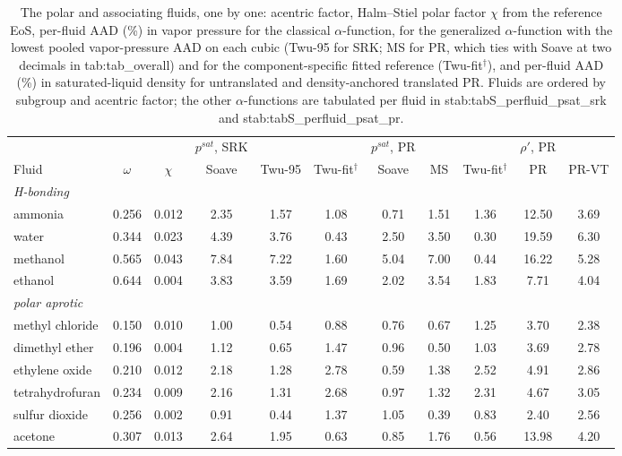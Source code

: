 \begin{table}[H]
\centering
\caption{The polar and associating fluids, one by one: acentric factor, Halm--Stiel polar factor $\chi$ from the reference EoS, per-fluid AAD (\%) in vapor pressure for the classical $\alpha$-function, for the generalized $\alpha$-function with the lowest pooled vapor-pressure AAD on each cubic (Twu-95 for SRK; MS for PR, which ties with Soave at two decimals in {tab:tab_overall}) and for the component-specific fitted reference (Twu-fit$^{\dagger}$), and per-fluid AAD (\%) in saturated-liquid density for untranslated and density-anchored translated PR. Fluids are ordered by subgroup and acentric factor; the other $\alpha$-functions are tabulated per fluid in {stab:tabS_perfluid_psat_srk} and {stab:tabS_perfluid_psat_pr}.}
\label{tab:tab_polar}
\small
\begin{tabular}{lcccccccccc}
\toprule
 &  &  & $p^{sat}$, SRK &  &  & $p^{sat}$, PR &  &  & $\rho'$, PR &  \\
Fluid & $\omega$ & $\chi$ & Soave & Twu-95 & Twu-fit$^{\dagger}$ & Soave & MS & Twu-fit$^{\dagger}$ & PR & PR-VT \\
\midrule
\multicolumn{11}{l}{\emph{H-bonding}} \\
ammonia & 0.256 & 0.012 & 2.35 & 1.57 & 1.08 & 0.71 & 1.51 & 1.36 & 12.50 & 3.69 \\
water & 0.344 & 0.023 & 4.39 & 3.76 & 0.43 & 2.50 & 3.50 & 0.30 & 19.59 & 6.30 \\
methanol & 0.565 & 0.043 & 7.84 & 7.22 & 1.60 & 5.04 & 7.00 & 0.44 & 16.22 & 5.28 \\
ethanol & 0.644 & 0.004 & 3.83 & 3.59 & 1.69 & 2.02 & 3.54 & 1.83 & 7.71 & 4.04 \\
\multicolumn{11}{l}{\emph{polar aprotic}} \\
methyl chloride & 0.150 & 0.010 & 1.00 & 0.54 & 0.88 & 0.76 & 0.67 & 1.25 & 3.70 & 2.38 \\
dimethyl ether & 0.196 & 0.004 & 1.12 & 0.65 & 1.47 & 0.96 & 0.50 & 1.03 & 3.69 & 2.78 \\
ethylene oxide & 0.210 & 0.012 & 2.18 & 1.28 & 2.78 & 0.59 & 1.38 & 2.52 & 4.91 & 2.86 \\
tetrahydrofuran & 0.234 & 0.009 & 2.16 & 1.31 & 2.68 & 0.97 & 1.32 & 2.31 & 4.67 & 3.05 \\
sulfur dioxide & 0.256 & 0.002 & 0.91 & 0.44 & 1.37 & 1.05 & 0.39 & 0.83 & 2.40 & 2.56 \\
acetone & 0.307 & 0.013 & 2.64 & 1.95 & 0.63 & 0.85 & 1.76 & 0.56 & 13.98 & 4.20 \\
\bottomrule
\end{tabular}
\end{table}
